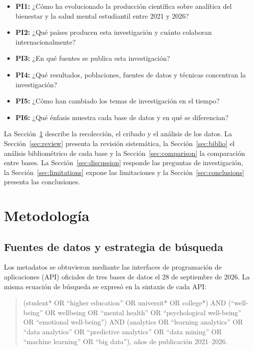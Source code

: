 \documentclass[11pt,a4paper]{article}
\begin{document}
\begin{itemize}
  \item \textbf{PI1:} ¿Cómo ha evolucionado la producción científica sobre analítica del bienestar y la salud mental estudiantil entre 2021 y 2026?
  \item \textbf{PI2:} ¿Qué países producen esta investigación y cuánto colaboran internacionalmente?
  \item \textbf{PI3:} ¿En qué fuentes se publica esta investigación?
  \item \textbf{PI4:} ¿Qué resultados, poblaciones, fuentes de datos y técnicas concentran la investigación?
  \item \textbf{PI5:} ¿Cómo han cambiado los temas de investigación en el tiempo?
  \item \textbf{PI6:} ¿Qué énfasis muestra cada base de datos y en qué se diferencian?
\end{itemize}

La Sección~\ref{sec:method} describe la recolección, el cribado y el análisis de los datos. La Sección~\ref{sec:review} presenta la revisión sistemática, la Sección~\ref{sec:biblio} el análisis bibliométrico de cada base y la Sección~\ref{sec:comparison} la comparación entre bases. La Sección~\ref{sec:discussion} responde las preguntas de investigación, la Sección~\ref{sec:limitations} expone las limitaciones y la Sección~\ref{sec:conclusions} presenta las conclusiones.

\section{Metodología}\label{sec:method}

\subsection{Fuentes de datos y estrategia de búsqueda}

Los metadatos se obtuvieron mediante las interfaces de programación de aplicaciones (API) oficiales de tres bases de datos el 28 de septiembre de 2026. La misma ecuación de búsqueda se expresó en la sintaxis de cada API:

\begin{quote}\small
(student* OR ``higher education'' OR universit* OR college*) AND (``well-being'' OR wellbeing OR ``mental health'' OR ``psychological well-being'' OR ``emotional well-being'') AND (analytics OR ``learning analytics'' OR ``data analytics'' OR ``predictive analytics'' OR ``data mining'' OR ``machine learning'' OR ``big data''), años de publicación 2021--2026.
\end{quote}
\end{document}
